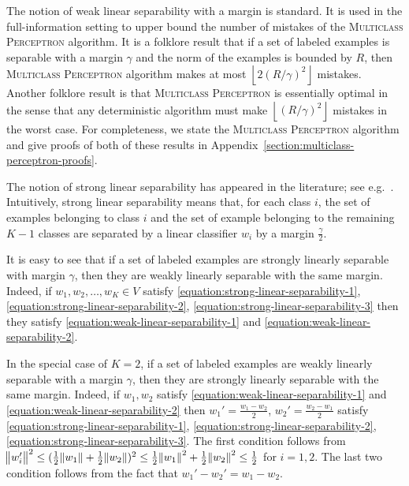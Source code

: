 The notion of weak linear separability with a margin is standard. It is used in
the full-information setting to upper bound the number of mistakes of the
\textsc{Multiclass Perceptron} algorithm. It is a folklore result that if a set
of labeled examples is separable with a margin $\gamma$ and the norm of the
examples is bounded by $R$, then \textsc{Multiclass Perceptron} algorithm makes
at most $\left\lfloor 2(R/\gamma)^2 \right \rfloor$ mistakes. Another folklore
result is that \textsc{Multiclass Perceptron} is essentially optimal in the
sense that any deterministic algorithm must make $\left\lfloor (R/\gamma)^2
\right \rfloor$ mistakes in the worst case. For completeness, we state the
\textsc{Multiclass Perceptron} algorithm and give proofs of both of these
results in Appendix~\ref{section:multiclass-perceptron-proofs}.

The notion of strong linear separability has appeared in the literature; see
e.g.~\citet{Chen-Chen-Zhang-Chen-Zhang-2009}.
Intuitively, strong linear
separability means that, for each class $i$, the set of examples belonging to
class $i$ and the set of example belonging to the remaining $K-1$ classes are
separated by a linear classifier $w_i$ by a margin $\frac \gamma 2$.

It is easy to see that if a set of labeled examples are strongly linearly
separable with margin $\gamma$, then they are weakly linearly separable with
the same margin. Indeed, if $w_1, w_2, \dots, w_K \in V$
satisfy \eqref{equation:strong-linear-separability-1},
\eqref{equation:strong-linear-separability-2},
\eqref{equation:strong-linear-separability-3} then they satisfy
\eqref{equation:weak-linear-separability-1} and
\eqref{equation:weak-linear-separability-2}.

In the special case of $K=2$, if a set of labeled examples are weakly linearly
separable with a margin $\gamma$, then they are strongly linearly separable with
the same margin. Indeed, if $w_1, w_2$ satisfy
\eqref{equation:weak-linear-separability-1} and
\eqref{equation:weak-linear-separability-2} then $w_1' = \frac{w_1 - w_2}{2}$,
$w_2' = \frac{w_2 - w_1}{2}$ satisfy
\eqref{equation:strong-linear-separability-1},
\eqref{equation:strong-linear-separability-2},
\eqref{equation:strong-linear-separability-3}. The first condition follows from
$\norm{w_i'}^2 \le (\frac{1}{2} \norm{w_1} + \frac{1}{2} \norm{w_2})^2 \le
\frac{1}{2}\norm{w_1}^2 + \frac{1}{2}\norm{w_2}^2 \le \frac{1}{2}$ for $i=1,2$.
The last two condition follows from the fact that $w_1' - w_2' = w_1 - w_2$.


